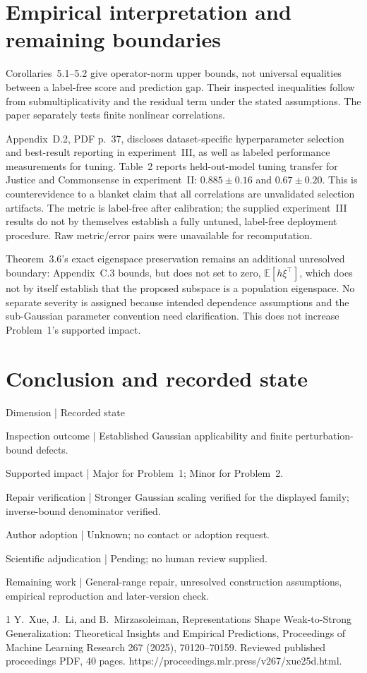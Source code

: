 \documentclass[10pt]{article}
\begin{document}
\section*{Empirical interpretation and remaining boundaries}
Corollaries 5.1–5.2 give operator-norm upper bounds, not universal equalities between a label-free score and prediction gap. Their inspected inequalities follow from submultiplicativity and the residual term under the stated assumptions. The paper separately tests finite nonlinear correlations.\par
Appendix D.2, PDF p. 37, discloses dataset-specific hyperparameter selection and best-result reporting in experiment III, as well as labeled performance measurements for tuning. Table 2 reports held-out-model tuning transfer for Justice and Commonsense in experiment II: \(0.885\pm0.16\) and \(0.67\pm0.20\). This is counterevidence to a blanket claim that all correlations are unvalidated selection artifacts. The metric is label-free after calibration; the supplied experiment III results do not by themselves establish a fully untuned, label-free deployment procedure. Raw metric/error pairs were unavailable for recomputation.\par
Theorem 3.6’s exact eigenspace preservation remains an additional unresolved boundary: Appendix C.3 bounds, but does not set to zero, \(\mathbb E[h\xi^\top]\), which does not by itself establish that the proposed subspace is a population eigenspace. No separate severity is assigned because intended dependence assumptions and the sub-Gaussian parameter convention need clarification. This does not increase Problem 1’s supported impact.\par
\section*{Conclusion and recorded state}
Dimension | Recorded state\par
Inspection outcome | Established Gaussian applicability and finite perturbation-bound defects.\par
Supported impact | Major for Problem 1; Minor for Problem 2.\par
Repair verification | Stronger Gaussian scaling verified for the displayed family; inverse-bound denominator verified.\par
Author adoption | Unknown; no contact or adoption request.\par
Scientific adjudication | Pending; no human review supplied.\par
Remaining work | General-range repair, unresolved construction assumptions, empirical reproduction and later-version check.\par
1 Y. Xue, J. Li, and B. Mirzasoleiman, Representations Shape Weak-to-Strong Generalization: Theoretical Insights and Empirical Predictions, Proceedings of Machine Learning Research 267 (2025), 70120–70159. Reviewed published proceedings PDF, 40 pages. https://proceedings.mlr.press/v267/xue25d.html.\par
\end{document}
